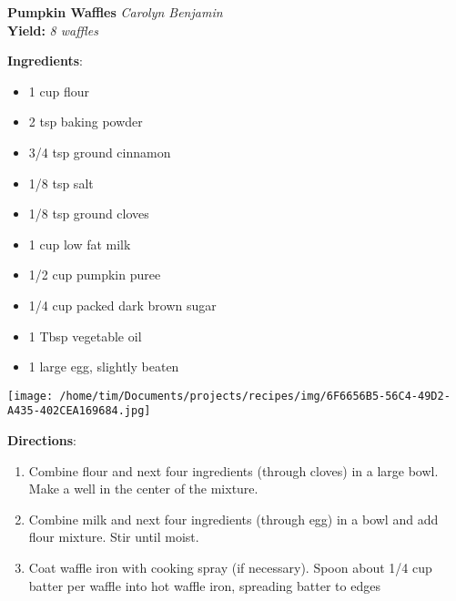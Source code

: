 \documentclass[11pt, twoside, openany]{book}
\begin{document}
\noindent\begin{minipage}[t]{\linewidth}%
{\Large\textbf{Pumpkin Waffles}} \label{pumpkin-waffles}\hfill\textit{Carolyn Benjamin}\\
\textbf{Yield:} \textit{8 waffles}\\
\noindent\begin{minipage}[t]{0.78\linewidth}%
\textbf{Ingredients}:\vspace{-3mm}
\begin{multicols}{2}
\begin{itemize}\setlength\itemsep{-1mm}
\item 1 cup flour
\item 2 tsp baking powder
\item 3/4 tsp ground cinnamon
\item 1/8 tsp salt
\item 1/8 tsp ground cloves
\item 1 cup low fat milk
\item 1/2 cup pumpkin puree
\item 1/4 cup packed dark brown sugar
\item 1 Tbsp vegetable oil
\item 1 large egg, slightly beaten
\end{itemize}
\end{multicols}
\end{minipage}
\noindent\begin{minipage}[t]{0.18\linewidth}
\centering \strut\vspace*{-\baselineskip}\newline
\texttt{[image: /home/tim/Documents/projects/recipes/img/6F6656B5-56C4-49D2-A435-402CEA169684.jpg]}\\
\end{minipage}\vspace{3mm}
\textbf{Directions}:
\vspace{-3mm}\begin{enumerate}\setlength\itemsep{-1mm}
\item Combine flour and next four ingredients (through cloves) in a large bowl. Make a well in the center of the mixture.
\item Combine milk and next four ingredients (through egg) in a bowl and add flour mixture. Stir until moist.
\item Coat waffle iron with cooking spray (if necessary). Spoon about 1/4 cup batter per waffle into hot waffle iron, spreading batter to edges
\end{enumerate}
\end{minipage}\vspace{8mm}
\end{document}
